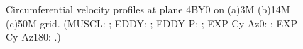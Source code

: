 \begin{figure}[t]
     \caption{Circumferential velocity profiles at plane 4BY0 on (a)3M (b)14M (c)50M grid. (MUSCL: \mline; EDDY: \eline; EDDY-P: \epline; EXP Cy Az0: \bluecrx; EXP Cy Az180: \redcrx.)}
     \label{v} 
\end{figure}
